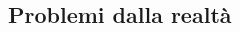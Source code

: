 \begin{multicols}{2}
% 
% 
% 
% 
% 
% 
% 
% 
% 
% 
% 
% 

\end{multicols}

\subsection{Problemi dalla realtà}


